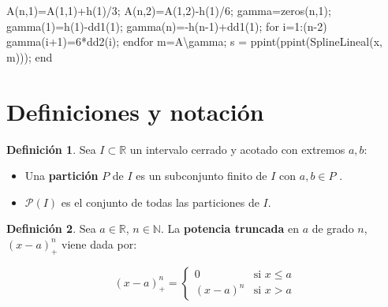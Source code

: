 \documentclass[11pt,spanish,]{article}
\newenvironment{Shaded}{}{}
\newcommand{\BaseNTok}[1]{\textcolor[rgb]{0.25,0.63,0.44}{{#1}}}
\newcommand{\FloatTok}[1]{\textcolor[rgb]{0.25,0.63,0.44}{{#1}}}
\newcommand{\FunctionTok}[1]{\textcolor[rgb]{0.02,0.16,0.49}{{#1}}}
\newcommand{\NormalTok}[1]{{#1}}
\theoremstyle{definition} \newtheorem*{definicion}{Definición}
\begin{document}
\begin{Shaded}
\begin{Highlighting}[]
   \NormalTok{A(n,}\FloatTok{1}\NormalTok{)=A(}\FloatTok{1}\NormalTok{,}\FloatTok{1}\NormalTok{)+h(}\FloatTok{1}\NormalTok{)/}\FloatTok{3}\NormalTok{;}
   \NormalTok{A(n,}\FloatTok{2}\NormalTok{)=A(}\FloatTok{1}\NormalTok{,}\FloatTok{2}\NormalTok{)-h(}\FloatTok{1}\NormalTok{)/}\FloatTok{6}\NormalTok{;}
   \FunctionTok{gamma}\NormalTok{=}\FunctionTok{zeros}\NormalTok{(n,}\FloatTok{1}\NormalTok{);}
        \FunctionTok{gamma}\NormalTok{(}\FloatTok{1}\NormalTok{)=h(}\FloatTok{1}\NormalTok{)-dd1(}\FloatTok{1}\NormalTok{);}
   \FunctionTok{gamma}\NormalTok{(n)=-h(n-}\FloatTok{1}\NormalTok{)+dd1(}\FloatTok{1}\NormalTok{);}
        \NormalTok{for }\BaseNTok{i}\NormalTok{=}\FloatTok{1}\NormalTok{:(n-}\FloatTok{2}\NormalTok{)}
                \FunctionTok{gamma}\NormalTok{(}\BaseNTok{i}\NormalTok{+}\FloatTok{1}\NormalTok{)=}\FloatTok{6}\NormalTok{*dd2(}\BaseNTok{i}\NormalTok{);}
        \NormalTok{endfor}
   \NormalTok{m=A\textbackslash{}}\FunctionTok{gamma}\NormalTok{;}
    \NormalTok{s = ppint(ppint(SplineLineal(x, m)));}
\NormalTok{end}
\end{Highlighting}
\end{Shaded}

\pagebreak
\appendix

\section{Definiciones y notación}\label{definiciones-y-notaciuxf3n}

\begin{definicion}
Sea $I \subset \mathbb{R}$ un intervalo cerrado y acotado con extremos $a,b$:

\begin{itemize}
\item Una \textbf{partición} $P$ de $I$ es un subconjunto finito de $I$ con $a,b\in P$ .
\item $\mathscr{P}(I)$ es el conjunto de todas las particiones de $I$.
\end{itemize}
\end{definicion}

\vspace*{3pt}

\begin{definicion} Sea $a \in \mathbb{R}$, $n \in \mathbb{N}$. La
\textbf{potencia truncada} en $a$ de grado $n$, $(x - a)_+^n$ viene dada por:

\[
 (x - a)_+^n =
  \begin{cases}
      0             & \text{si } x \leq a \\
   (x - a)^n   & \text{si } x > a
  \end{cases}
\]
\end{definicion}
\end{document}
